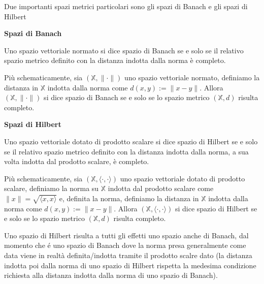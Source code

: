 Due importanti spazi metrici particolari sono gli spazi di Banach e gli spazi di Hilbert

\textbf{Spazi di Banach}

Uno spazio vettoriale normato si dice spazio di Banach se e solo se il relativo spazio metrico
definito con la distanza indotta dalla norma è completo.

Più schematicamente, sia $\left(\mathbb{X}, \|\cdot\|\right)$ uno spazio vettoriale normato,
definiamo la distanza in $\mathbb{X}$ indotta dalla norma come $d\left(x,y\right):=\|x-y\|$.
Allora $\left(\mathbb{X}, \|\cdot\|\right)$ si dice spazio di Banach se e solo se lo spazio
metrico $\left(\mathbb{X}, d\right)$ risulta completo.



\textbf{Spazi di Hilbert}

Uno spazio vettoriale dotato di prodotto scalare si dice spazio di Hilbert se e solo se
il relativo spazio metrico definito con la distanza indotta dalla norma, a sua volta
indotta dal prodotto scalare, è completo.

Più schematicamente, sia $\left(\mathbb{X}, \langle\cdot,\cdot\rangle\right)$ uno spazio
vettoriale dotato di prodotto scalare, definiamo la norma su $\mathbb{X}$ indotta dal prodotto
scalare come $\|x\|=\sqrt{\langle x,x\rangle}$ e, definita la norma, definiamo la distanza in
$\mathbb{X}$ indotta dalla norma come $d\left(x,y\right):=\|x-y\|$.
Allora $\left(\mathbb{X}, \langle\cdot,\cdot\rangle\right)$ si dice spazio di Hilbert se e solo
se lo spazio metrico $\left(\mathbb{X}, d\right)$ risulta completo.

\begin{observation}
    Uno spazio di Hilbert risulta a tutti gli effetti uno spazio anche di Banach, dal momento
    che é uno spazio di Banach dove la norma presa generalmente come data viene in realtà
    definita/indotta tramite il prodotto scalre dato (la distanza indotta poi dalla norma
    di uno spazio di Hilbert rispetta la medesima condizione richiesta alla distanza indotta
    dalla norma di uno spazio di Banach).
\end{observation}